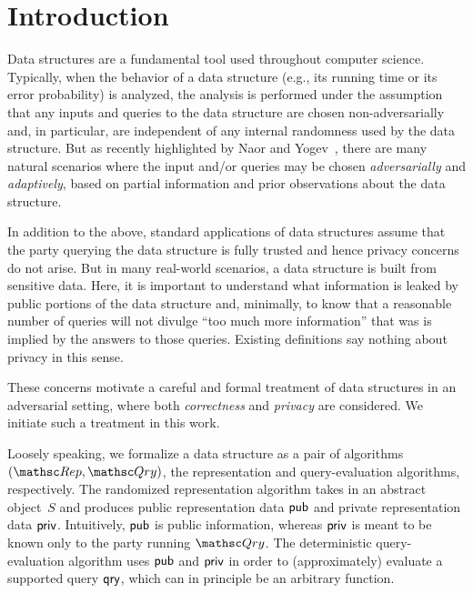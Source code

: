 \section{Introduction}
\label{sec:intro}

Data structures are a fundamental tool used throughout computer
science. Typically, when the behavior of a data structure (e.g., its
running time or its error probability) is analyzed, the analysis is
performed under the assumption that any inputs and queries to the
data structure are chosen non-adversarially and, in particular, are
independent of any internal randomness used by the data structure.
But as recently highlighted by Naor and Yogev~\cite{C:NaoYog15},
there are many natural scenarios where the input and/or queries may
be chosen \emph{adversarially} and \emph{adaptively}, based on
partial information and prior observations about the data structure.

In addition to the above, standard applications of data structures
assume that the party querying the data structure is fully trusted
and hence privacy concerns do not arise. But in many real-world
scenarios, a data structure is built from sensitive data.  Here, it
is important to understand what information is leaked by public
portions of the data structure and, minimally, to know that a
reasonable number of queries will not divulge ``too much more
information'' that was is implied by the answers to those queries.
Existing definitions say nothing about privacy in this sense.

These concerns motivate a careful and formal treatment of data
structures in an adversarial setting, where both \emph{correctness}
and \emph{privacy} are considered. We initiate such a treatment in
this work.

 Loosely speaking, we
formalize a data structure as a pair of algorithms $(\Rep,\Qry)$,
the representation and query-evaluation algorithms, respectively.
The randomized representation algorithm takes in an abstract
object~$S$ and produces public representation data ${\sf pub}$ and
private representation data ${\sf priv}$.  Intuitively, ${\sf pub}$ is
public information, whereas ${\sf priv}$ is meant to be known only to
the party running $\Qry$.  The deterministic query-evaluation
algorithm uses ${\sf pub}$ and ${\sf priv}$ in order to (approximately)
evaluate a supported query $\mathsf{qry}$, which can in principle be an
arbitrary function.


